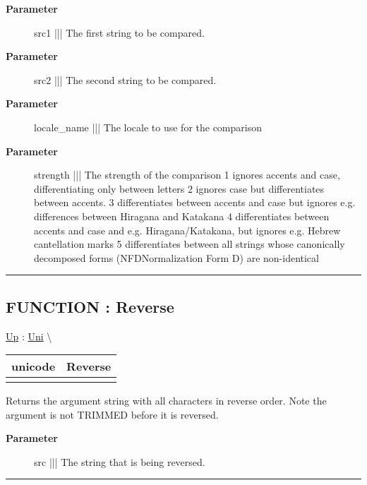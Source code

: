 \par
\begin{description}
\item [\textbf{Parameter}] src1 ||| The first string to be compared.
\item [\textbf{Parameter}] src2 ||| The second string to be compared.
\item [\textbf{Parameter}] locale\_name ||| The locale to use for the comparison
\item [\textbf{Parameter}] strength ||| The strength of the comparison 1 ignores accents and case, differentiating only between letters 2 ignores case but differentiates between accents. 3 differentiates between accents and case but ignores e.g. differences between Hiragana and Katakana 4 differentiates between accents and case and e.g. Hiragana/Katakana, but ignores e.g. Hebrew cantellation marks 5 differentiates between all strings whose canonically decomposed forms (NFDNormalization Form D) are non-identical
\end{description}

\rule{\linewidth}{0.5pt}
\subsection*{FUNCTION : Reverse}
\hypertarget{ecldoc:uni.reverse}{}
\hyperlink{ecldoc:Uni}{Up} :
\hspace{0pt} \hyperlink{ecldoc:Uni}{Uni} \textbackslash 

{\renewcommand{\arraystretch}{1.5}
\begin{tabularx}{\textwidth}{|>{\raggedright\arraybackslash}l|X|}
\hline
\hspace{0pt}unicode & Reverse \\
\hline
\multicolumn{2}{|>{\raggedright\arraybackslash}X|}{\hspace{0pt}(unicode src)} \\
\hline
\end{tabularx}
}

\par
Returns the argument string with all characters in reverse order. Note the argument is not TRIMMED before it is reversed.

\par
\begin{description}
\item [\textbf{Parameter}] src ||| The string that is being reversed.
\end{description}

\rule{\linewidth}{0.5pt}
